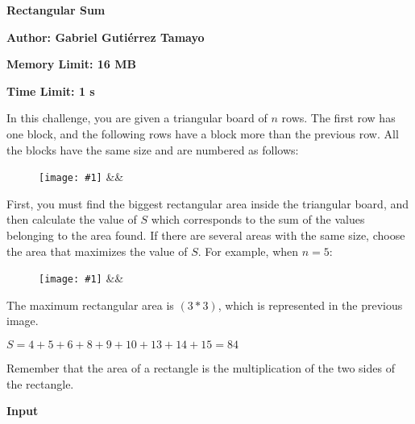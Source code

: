 \documentclass{article}
\newcommand{\englishProblemHeader}[4]{
	\begin{center} {\huge \sf \bfseries #1} \end{center}
	\vspace{-2mm}
	\centerline{\sf \bfseries Author: #2}
	\vspace{1mm}
	\centerline{\sf \bfseries Memory Limit: #3}
	\vspace{1mm}
	\centerline{\sf \bfseries Time Limit: #4}
	\vspace{10mm}
}
\newcommand{\printSubtitle}[1]{
	\vspace{1mm}
	\begin{flushleft} {\Large \sf \bfseries #1 \newline} \end{flushleft}
	\vspace{-4mm}
}
\newcommand{\image}[4]{
	\begin{figure}[h]
		\centering
		\texttt{[image: \#1]}
		\ifx&#4&\empty
		\else
			\caption{#4}
		\fi
	\end{figure}
}
\begin{document}


\englishProblemHeader{Rectangular Sum}{Gabriel Gutiérrez Tamayo}{16 MB}{1 s}




In this challenge, you are given a triangular board of $ n $ rows. The first row has one block, and the following rows
have a block more than the previous row. All the blocks have the same size and are numbered as follows:
\newline

\image{images/figure-1-block-numbering.png}{4.6cm}{4cm}{}

First, you must find the biggest rectangular area inside the triangular board, and then calculate the value of $ S $
which corresponds to the sum of the values belonging to the area found. If there are several areas with the same size,
choose the area that maximizes the value of $ S $. For example, when $ n = 5 $:

\image{images/figure-2-example-n-equal-5.png}{4cm}{4.15cm}{}

The maximum rectangular area is $ (3 * 3) $, which is represented in the previous image.
\newline

$ S = 4 + 5 + 6 + 8 + 9 + 10 + 13 + 14 + 15 = 84 $
\newline

Remember that the area of a rectangle is the multiplication of the two sides of the rectangle.
\newline




\printSubtitle{Input}
\end{document}
